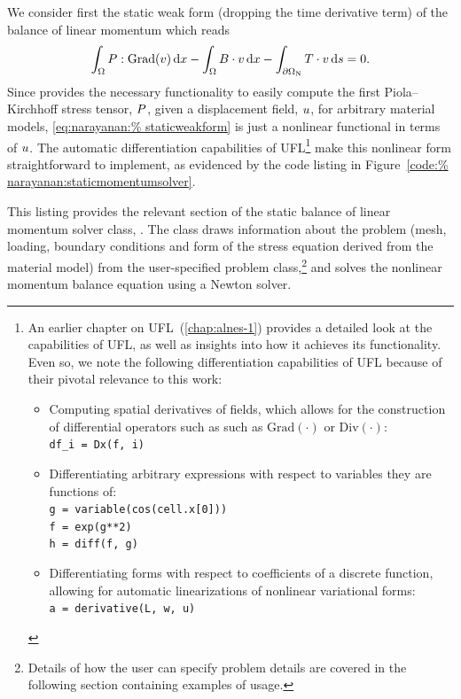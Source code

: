 We consider first the static weak form (dropping the time derivative
term) of the balance of linear momentum which reads\vspace*{-2pt}
\begin{equation}
  \int_{\Omega} \bP:\mathrm{Grad}(\bv) \dx - \int_{\Omega} \bB
  \cdot \bv \dx -  \int_{\partial\Omega_{\mathrm{N}}} \bT \cdot
  \bv \ds = 0.
\label{eq:narayanan:staticweakform}\vspace*{-2pt}
\end{equation}
Since \twist{} provides the necessary functionality to easily compute
the first Piola--Kirchhoff stress tensor, $\mbox{$ P$}$, given a displacement
field, $\mbox{$ u$}$, for arbitrary material models, \eqref{eq:narayanan:%
staticweakform} is just a nonlinear functional in terms of $\mbox{$ u$}$. The
automatic differentiation capabilities of UFL\footnote{An earlier
  chapter on UFL~(\ref{chap:alnes-1}) provides a detailed look at the
  capabilities of UFL, as well as insights into how it achieves its
  functionality. Even so, we note the following differentiation
  capabilities of UFL because of their pivotal relevance to this work:
  \begin{itemize}
  \item Computing spatial derivatives of fields, which allows for the
    construction of differential operators such as such as
    $\mathrm{Grad(\cdot)}$ or $\mathrm{Div(\cdot)}$:\\
    \texttt{df\_i = Dx(f, i)}
  \item Differentiating arbitrary expressions with respect to variables
    they are functions of:\\
    \texttt{g = variable(cos(cell.x[0]))}\\
    \texttt{f = exp(g**2)}\\
    \texttt{h = diff(f, g)}
  \item Differentiating forms with respect to coefficients of a discrete
    function, allowing for automatic linearizations of nonlinear
    variational forms:\\
    \texttt{a = derivative(L, w, u)}
  \end{itemize}} make this nonlinear form straightforward to
implement, as evidenced by the code listing in Figure~\ref{code:%
narayanan:staticmomentumsolver}.\enlargethispage{6pt}

This listing provides the relevant section of the static balance of
linear momentum solver class, . The
class draws information about the problem (mesh, loading, boundary
conditions and form of the stress equation derived from the material
model) from the user-specified problem class,\footnote{Details of how
the user can specify problem details are covered in the following
section containing examples of \twist{} usage.} and solves the
nonlinear momentum balance equation using a Newton solver.

